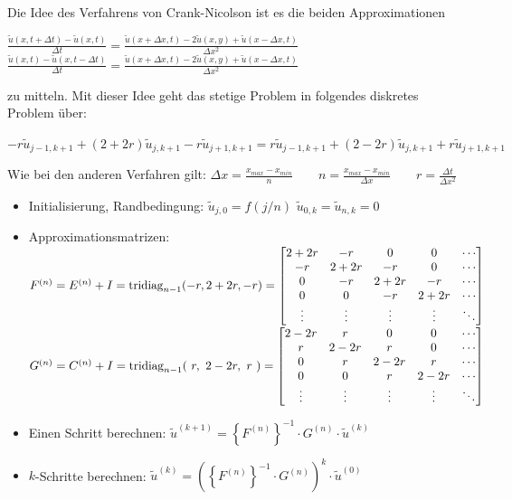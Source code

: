 Die Idee des Verfahrens von Crank-Nicolson ist es die beiden Approximationen

$\boxed{\frac{\tilde{u}(x,t+\Delta t) - \tilde{u}(x,t)}{\Delta t} = 
\frac{\tilde{u}(x+\Delta x, t)-2\tilde{u}(x,y) + \tilde{u}( x - \Delta x, t )} {\Delta x^2}}$
$\boxed{\frac{\tilde{u}(x,t) - \tilde{u}(x,t -\Delta t)}{\Delta t} = 
\frac{\tilde{u}(x+\Delta x, t)-2\tilde{u}(x,y) + \tilde{u}( x - \Delta x, t )} {\Delta x^2}}$

zu mitteln. Mit dieser Idee geht das stetige Problem in folgendes diskretes Problem über:

$-r \tilde{u}_{j-1,k+1} + (2+2r)\tilde{u}_{j,k+1} - r \tilde{u}_{j+1,k+1} = r
\tilde{u}_{j-1,k+1} + (2-2r)\tilde{u}_{j,k+1} + r \tilde{u}_{j+1,k+1} $

Wie bei den anderen Verfahren gilt: $\Delta x=\frac{x_{max}-x_{min}}{n}\qquad \boxed{n=\frac{x_{max}-x_{min}}{\Delta x}} \qquad \boxed{r=\frac{\Delta
t}{\Delta x^2}}$
\begin{itemize}
\item Initialisierung, Randbedingung: $\tilde{u}_{j,0}=f(j/n)$ \qquad $\tilde{u}_{0,k}=\tilde{u}_{n,k}=0$
\item Approximationsmatrizen:\\
$F^{(n)}=E^{(n)}+I=\operatorname{tridiag}_{n-1}(-r,2+2r,-r)=\begin{bmatrix}
2+2r& -r	& 0		& 0 	&\cdots\\
-r	& 2+2r  & -r	& 0		&\cdots\\
0	& -r	& 2+2r 	& -r 	&\cdots\\
0	& 0		& -r	& 2+2r 	&\cdots\\
\vdots&	\vdots&\vdots&\vdots&\ddots	
\end{bmatrix}$\\
$G^{(n)}=C^{(n)}+I=\operatorname{tridiag}_{n-1}(~r,~2-2r,~r~)=\begin{bmatrix}
2-2r& r		& 0		& 0 	&\cdots\\
r	& 2-2r  & r		& 0		&\cdots\\
0	& r		& 2-2r 	& r 	&\cdots\\
0	& 0		& r		& 2-2r 	&\cdots\\
\vdots&	\vdots&\vdots&\vdots&\ddots	
\end{bmatrix}$ 
\item Einen Schritt berechnen: $\tilde{u}^{(k+1)}=\left\{F^{(n)}\right\}^{-1} \cdot G^{(n)}\cdot \tilde{u}^{(k)}$
\item $k$-Schritte berechnen: $\tilde{u}^{(k)}=\left(\left\{F^{(n)}\right\}^{-1} \cdot G^{(n)}\right)^{k}\cdot \tilde{u}^{(0)}$
\end{itemize}

